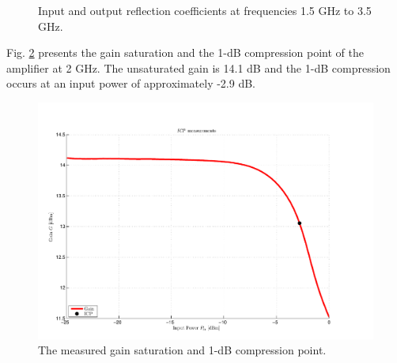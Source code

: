 \documentclass[a4paper, 12pt]{article}
\begin{document}
\begin{figure}[h]
\centering
{}
\caption{Input and output reflection coefficients at frequencies 1.5 GHz to 3.5 GHz.
\label{m:Smith_chart}}
\end{figure}

Fig. \ref{m:gain} presents the gain saturation and the 1-dB compression point of the amplifier at 2 GHz. The unsaturated gain is 14.1 dB and the 1-dB compression occurs at an input power of approximately -2.9 dB. 

\begin{figure}[!h]
	\begin{center}
	\includegraphics[width=5in]{data/Measurements/icp.pdf}
	\caption{The measured gain saturation and 1-dB compression point.}
	\label{m:gain}
	\end{center}
\end{figure}
\end{document}

